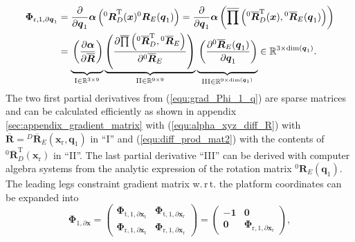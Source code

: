 \documentclass[robotics,article,submit,moreauthors,pdftex]{Definitions/mdpi}
\newcommand{\bm}[1]{\boldsymbol{#1}}
\newcommand{\rotmat}[2]{{{ }^{#1}\boldsymbol{R}}_{#2}}
\newcommand{\rotmato}[2]{{{ }^{#1}\boldsymbol{\overline{R}}}_{#2}}
\newcommand{\transp}[0]{{\mathrm{T}}}
\begin{document}

\begin{align}
\bm{\Phi}_{\mathrm{r},1,\partial\bm{q}_1}
&=
\frac{\partial}{\partial \bm{q}_1} \bm{\alpha}\left(\rotmat{0}{D}^\transp(\bm{x}) \rotmat{0}{E}(\bm{q}_1)\right)
=
\frac{\partial}{\partial \bm{q}_1} \bm{\alpha}\left(\overline{\prod}\left( \rotmato{0}{D}^\transp(\bm{x}), \rotmato{0}{E}(\bm{q}_1)\right)\right)  \label{equ:grad_Phi_1_q}\\
&=
\underbrace{\vphantom{\left(\frac{\partial \overline{\prod}\left(\rotmato{0}{D}^\transp, \rotmato{0}{E}\right)}{\partial \rotmato{0}{E}}\right)}\left(\frac{\partial \bm{\alpha}}{\partial \overline{\bm{R}}}\right)}_{\mathrm{I} \in {\mathbb{R}}^{3 \times 9}}
\underbrace{\left(\frac{\partial \overline{\prod}\left(\rotmato{0}{D}^\transp, \rotmato{0}{E}\right)}{\partial \rotmato{0}{E}}\right)}_{\mathrm{II} \in {\mathbb{R}}^{9 \times 9}}
\underbrace{\vphantom{\left(\frac{\partial \overline{\prod}\left(\rotmato{0}{D}^\transp, \rotmato{0}{E}\right)}{\partial \rotmato{0}{E}}\right)}\left(\frac{\partial \rotmato{0}{E}(\bm{q}_1)}{\partial \bm{q}_1} \right)}_{\mathrm{III} \in {\mathbb{R}}^{9 \times \mathrm{dim}(\bm{q}_1)}}
\in {\mathbb{R}}^{3 \times \mathrm{dim}(\bm{q}_1)}.  \nonumber
\end{align}
%
The two first partial derivatives from (\ref{equ:grad_Phi_1_q}) are sparse matrices and can be calculated efficiently as shown in appendix \ref{sec:appendix_gradient_matrix} with (\ref{equ:alpha_xyz_diff_R}) with $\overline{\bm{R}}=\rotmato{D}{E}(\bm{x}_{\mathrm{r}},\bm{q}_1)$ in ``I'' and (\ref{equ:diff_prod_mat2}) with the contents of $\rotmato{0}{D}^\transp(\bm{x}_{\mathrm{r}})$ in ``II''.
The last partial derivative ``III'' can be derived with computer algebra systems from the analytic expression of the rotation matrix $\rotmat{0}{E}(\bm{q}_1)$.
The leading legs constraint gradient matrix w.\,r\,t. the platform coordinates can be expanded into
%
\begin{equation}
\bm{\Phi}_{1,\partial\bm{x}}
=
\begin{pmatrix}
\bm{\Phi}_{\mathrm{t},1,\partial\bm{x}_\mathrm{t}} & \bm{\Phi}_{\mathrm{t},1,\partial\bm{x}_\mathrm{r}} \\
\bm{\Phi}_{\mathrm{r},1,\partial\bm{x}_\mathrm{t}} &
\bm{\Phi}_{\mathrm{r},1,\partial\bm{x}_\mathrm{r}}
\end{pmatrix}
=
\begin{pmatrix}
-\bm{1} & \bm{0} \\
\bm{0} &
\bm{\Phi}_{\mathrm{r},1,\partial\bm{x}_\mathrm{r}}
\end{pmatrix},
\label{equ:Phi_1_grad_x}
\end{equation}
\end{document}
